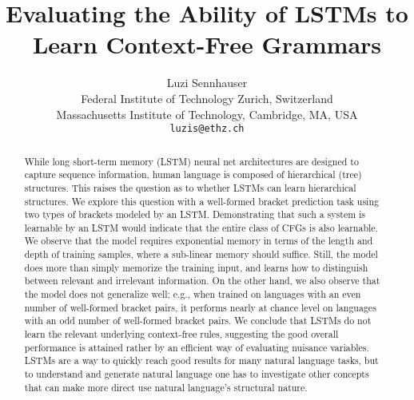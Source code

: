 \documentclass[11pt,a4paper]{article}
\title{Evaluating the Ability of LSTMs to Learn Context-Free Grammars}
\author{Luzi Sennhauser \\
  Federal Institute of Technology Zurich, Switzerland \\
  Massachusetts Institute of Technology, Cambridge, MA, USA \\
  {\tt luzis@ethz.ch}
}
\date{}
\begin{document}
\maketitle
\begin{abstract}


While long short-term memory (LSTM) neural net architectures are designed to capture sequence information, human language is composed of hierarchical (tree) structures. This raises the question as to whether LSTMs can learn hierarchical structures. We explore this question with a well-formed bracket prediction task using two types of brackets modeled by an LSTM.%
Demonstrating that such a system is learnable by an LSTM would indicate that the entire class of CFGs is also learnable.  We observe that the model requires exponential memory in terms of the length and depth of training samples, where a sub-linear memory should suffice.
Still, the model does more than simply memorize the training input, and learns how to distinguish between relevant and irrelevant information. On the other hand, we also observe that the model does not generalize well; e.g., when trained on languages with an even number of well-formed bracket pairs, it performs nearly at chance level on languages with an odd number of well-formed bracket pairs.
We conclude that LSTMs do not learn the relevant underlying context-free rules, suggesting the good overall performance is attained rather by an efficient way of evaluating nuisance variables. LSTMs are a way to quickly reach good results for many natural language tasks, but to understand and generate natural language one has to investigate other concepts that can make more direct use natural language's structural nature.
\end{abstract}
\end{document}

